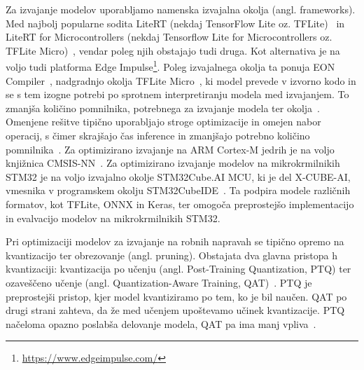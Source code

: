 \documentclass[a4paper,twoside,openright,12pt,slovene]{book}
\begin{document}
        Za izvajanje modelov uporabljamo namenska izvajalna okolja (angl. frameworks). Med najbolj popularne sodita LiteRT (nekdaj TensorFlow Lite oz. TFLite)~\cite{src:litert} in LiteRT for Microcontrollers (nekdaj Tensorflow Lite for Microcontrollers oz. TFLite Micro)~\cite{src:litertmicro, src:david2021tensorflowlitemicro}, vendar poleg njih obstajajo tudi druga.
        Kot alternativa je na voljo tudi platforma Edge Impulse\footnote{\url{https://www.edgeimpulse.com/}}. Poleg izvajalnega okolja ta ponuja EON Compiler~\cite{src:edgeimpulse_eon}, nadgradnjo okolja TFLite Micro~\cite{src:litertmicro}, ki model prevede v izvorno kodo in se s tem izogne potrebi po sprotnem interpretiranju modela med izvajanjem. To zmanjša količino pomnilnika, potrebnega za izvajanje modela ter okolja~\cite{src:edgeimpulse_eon}.
        Omenjene rešitve tipično uporabljajo stroge optimizacije in omejen nabor operacij, s čimer skrajšajo čas inference in zmanjšajo potrebno količino pomnilnika~\cite{src:abadade2023comprehensive}. Za optimizirano izvajanje na ARM Cortex-M jedrih je na voljo knjižnica CMSIS-NN~\cite{src:lai2018cmsis}.
        Za optimizirano izvajanje modelov na mikrokrmilnikih STM32 je na voljo izvajalno okolje STM32Cube.AI MCU, ki je del X-CUBE-AI, vmesnika v programskem okolju STM32CubeIDE~\cite{src:stxcubeai-docs}.
        Ta podpira modele različnih formatov, kot TFLite, ONNX in Keras, ter omogoča preprostejšo implementacijo in evalvacijo modelov na mikrokrmilnikih STM32.

        Pri optimizaciji modelov za izvajanje na robnih napravah se tipično opremo na kvantizacijo ter obrezovanje (angl. pruning).
        Obstajata dva glavna pristopa h kvantizaciji: kvantizacija po učenju (angl. Post-Training Quantization, PTQ) ter ozaveščeno učenje (angl. Quantization-Aware Training, QAT)~\cite{src:jacob2018quantization, src:nagel2021white, src:gholami2022survey}. PTQ je preprostejši pristop, kjer model kvantiziramo po tem, ko je bil naučen.
        QAT po drugi strani zahteva, da že med učenjem upoštevamo učinek kvantizacije. PTQ načeloma opazno poslabša delovanje modela, QAT pa ima manj vpliva~\cite{src:Nikodinovska_2024}.
\end{document}
